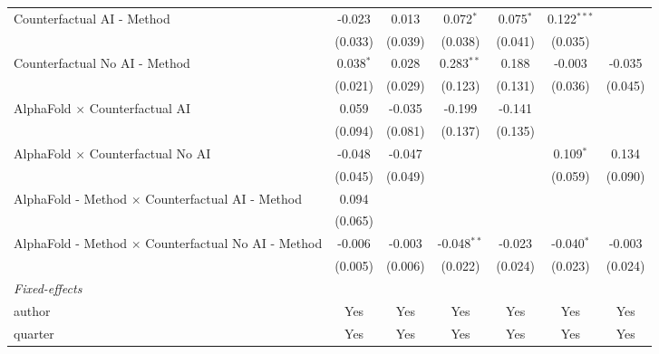\begin{tabular}{lcccccc}
   Counterfactual AI - Method                                 & -0.023       & 0.013   & 0.072$^{*}$   & 0.075$^{*}$  & 0.122$^{***}$  &   \\   
                                                              & (0.033)      & (0.039) & (0.038)       & (0.041)      & (0.035)        &   \\   
   Counterfactual No AI - Method                              & 0.038$^{*}$  & 0.028   & 0.283$^{**}$  & 0.188        & -0.003         & -0.035\\   
                                                              & (0.021)      & (0.029) & (0.123)       & (0.131)      & (0.036)        & (0.045)\\   
   AlphaFold $\times$ Counterfactual AI                       & 0.059        & -0.035  & -0.199        & -0.141       &                &   \\   
                                                              & (0.094)      & (0.081) & (0.137)       & (0.135)      &                &   \\   
   AlphaFold $\times$ Counterfactual No AI                    & -0.048       & -0.047  &               &              & 0.109$^{*}$    & 0.134\\   
                                                              & (0.045)      & (0.049) &               &              & (0.059)        & (0.090)\\   
   AlphaFold - Method $\times$ Counterfactual AI - Method     & 0.094        &         &               &              &                &   \\   
                                                              & (0.065)      &         &               &              &                &   \\   
   AlphaFold - Method $\times$ Counterfactual No AI - Method  & -0.006       & -0.003  & -0.048$^{**}$ & -0.023       & -0.040$^{*}$   & -0.003\\   
                                                              & (0.005)      & (0.006) & (0.022)       & (0.024)      & (0.023)        & (0.024)\\   
   \midrule
   \emph{Fixed-effects}\\
   author                                                     & Yes          & Yes     & Yes           & Yes          & Yes            & Yes\\  
   quarter                                                    & Yes          & Yes     & Yes           & Yes          & Yes            & Yes\\  

\end{tabular}
